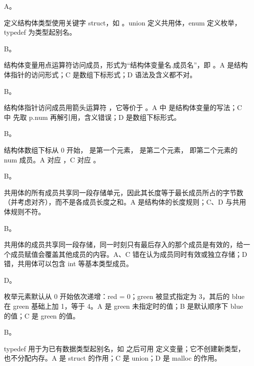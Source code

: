 \documentclass[a4paper,11pt]{article}
\begin{document}


\q A。\begin{analysis}定义结构体类型使用关键字 struct，如 。union 定义共用体，enum 定义枚举，typedef 为类型起别名。\end{analysis}

\q B。\begin{analysis}结构体变量用点运算符访问成员，形式为“结构体变量名.成员名”，即 。A 是结构体指针的访问形式；C 是数组下标形式；D 语法及含义都不对。\end{analysis}

\q B。\begin{analysis}结构体指针访问成员用箭头运算符 ，它等价于 。A 中  是结构体变量的写法；C 中  先取 p.num 再解引用，含义错误；D 是数组下标形式。\end{analysis}

\q B。\begin{analysis}结构体数组下标从 0 开始， 是第一个元素， 是第二个元素， 即第二个元素的 num 成员。A 对应 ，C 对应 。\end{analysis}

\q B。\begin{analysis}共用体的所有成员共享同一段存储单元，因此其长度等于最长成员所占的字节数（并考虑对齐），而不是各成员长度之和。A 是结构体的长度规则；C、D 与共用体规则不符。\end{analysis}

\q B。\begin{analysis}共用体的成员共享同一段存储，同一时刻只有最后存入的那个成员是有效的，给一个成员赋值会覆盖其他成员的内容。A、C 错在认为成员同时有效或独立存储；D 错，共用体可以包含 int 等基本类型成员。\end{analysis}

\q D。\begin{analysis}枚举元素默认从 0 开始依次递增：red = 0；green 被显式指定为 3，其后的 blue 在 green 基础上加 1，等于 4。A 是 green 未指定时的值；B 是默认顺序下 blue 的值；C 是 green 的值。\end{analysis}

\q B。\begin{analysis}typedef 用于为已有数据类型起别名，如  之后可用  定义变量；它不创建新类型，也不分配内存。A 是 struct 的作用；C 是 union；D 是 malloc 的作用。\end{analysis}
\end{document}
